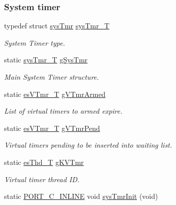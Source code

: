 \subsubsection*{System timer}
\begin{DoxyCompactItemize}
\item 
typedef struct \hyperlink{structsysTmr}{sys\-Tmr} \hyperlink{group__kern__impl_gae4999a40bf000fe53ce472e1f88233d2}{sys\-Tmr\-\_\-\-T}
\begin{DoxyCompactList}\small\item\em System Timer type. \end{DoxyCompactList}\item 
static \hyperlink{group__kern__impl_gae4999a40bf000fe53ce472e1f88233d2}{sys\-Tmr\-\_\-\-T} \hyperlink{group__kern__impl_ga7cf5c5d1e8a2f1ccf59d65bc409d82c3}{g\-Sys\-Tmr}
\begin{DoxyCompactList}\small\item\em Main System Timer structure. \end{DoxyCompactList}\item 
static \hyperlink{group__kern__intf_ga3c020f0ca54ff412bc1d1505502d2afc}{es\-V\-Tmr\-\_\-\-T} \hyperlink{group__kern__impl_ga69378b000a004da276419e5a394faaca}{g\-V\-Tmr\-Armed}
\begin{DoxyCompactList}\small\item\em List of virtual timers to armed expire. \end{DoxyCompactList}\item 
static \hyperlink{group__kern__intf_ga3c020f0ca54ff412bc1d1505502d2afc}{es\-V\-Tmr\-\_\-\-T} \hyperlink{group__kern__impl_gac3aa245b43e7f69c7e184756bc56af2c}{g\-V\-Tmr\-Pend}
\begin{DoxyCompactList}\small\item\em Virtual timers pending to be inserted into waiting list. \end{DoxyCompactList}\item 
static \hyperlink{group__kern__intf_ga62e3a3ca0a4597a19c43cb8868810d82}{es\-Thd\-\_\-\-T} \hyperlink{group__kern__impl_ga7725555010cb1e7f32842aa5755a6945}{g\-K\-V\-Tmr}
\begin{DoxyCompactList}\small\item\em Virtual timer thread I\-D. \end{DoxyCompactList}\item 
static \hyperlink{group__template__compiler_ga87952d6e574c7f437503926e833ba345}{P\-O\-R\-T\-\_\-\-C\-\_\-\-I\-N\-L\-I\-N\-E} void \hyperlink{group__kern__impl_gaa284b6ec458b79a49c54eedc738259fb}{sys\-Tmr\-Init} (void)

\end{DoxyCompactItemize}
